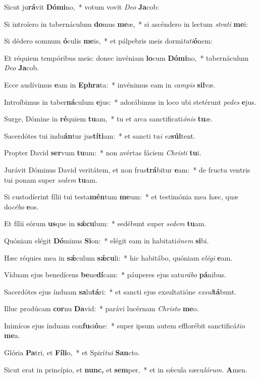 \item Sicut ju\textbf{rá}vit \textbf{Dó}\textbf{mi}no,~* votum vovit \textit{Deo} \textbf{Ja}cob:
\item Si introíero in tabernáculum \textbf{do}mus \textbf{me}æ,~* si ascéndero in lectum \textit{strati} \textbf{me}i:
\item Si dédero somnum \textbf{ó}culis \textbf{me}is,~* et pálpebris meis dormi\textit{tati}\textbf{ó}nem:
\item Et réquiem tempóribus meis: donec invéniam \textbf{lo}cum \textbf{Dó}\textbf{mi}no,~* tabernáculum \textit{Deo} \textbf{Ja}cob.
\item Ecce audívimus \textbf{e}am in \textbf{E}\textbf{phra}ta:~* invénimus eam in \textit{campis} \textbf{sil}væ.
\item Introíbimus in taber\textbf{ná}culum \textbf{e}jus:~* adorábimus in loco ubi stetérunt \textit{pedes} \textbf{e}jus.
\item Surge, Dómine in \textbf{ré}quiem \textbf{tu}am,~* tu et arca sanctificati\textit{ónis} \textbf{tu}æ.
\item Sacerdótes tui indu\textbf{án}tur jus\textbf{tí}\textbf{ti}am:~* et sancti tu\tinyhspace\textit{i} \textit{ex}\teenyhspace\textbf{súl}tent.
\item Propter David \textbf{ser}vum \textbf{tu}um:~* non avértas fáciem \textit{Christi} \textbf{tu}i.
\item Jurávit Dóminus David veritátem, et non frus\textbf{trá}bitur \textbf{e}am:~* de fructu ventris tui ponam super \textit{sedem} \textbf{tu}am.
\item Si custodíerint fílii tui testa\textbf{mén}tum \textbf{me}um:~* et testimónia mea hæc, quæ do\tinyhspace\textit{cébo} \textbf{e}os.
\item Et fílii eórum \textbf{us}que in \textbf{sǽ}\textbf{cu}lum:~* sedébunt super \textit{sedem} \textbf{tu}am.
\item Quóniam elégit \textbf{Dó}minus \textbf{Si}on:~* elégit eam in habitati\tinyhspace\textit{ónem} \textbf{si}bi.
\item Hæc réquies mea in \textbf{sǽ}culum \textbf{sǽ}\textbf{cu}li:~* hic habitábo, quóniam e\textit{légi} \textbf{e}am.
\item Víduam ejus benedícens \textbf{be}ne\textbf{dí}cam:~* páuperes ejus satu\tinyhspace\textit{rábo} \textbf{pá}nibus.
\item Sacerdótes ejus índuam \textbf{sa}lu\textbf{tá}ri:~* et sancti ejus exsultatióne \textit{exsul}\textbf{tá}bunt.
\item Illuc prodúcam \textbf{cor}nu \textbf{Da}vid:~* parávi lucérnam \textit{Christo} \textbf{me}o.
\item Inimícos ejus índuam con\textbf{fu}si\textbf{ó}ne:~* super ipsum autem efflorébit sanctificá\tinyhspace\textit{tio} \textbf{me}a.
\item Glória \textbf{Pa}tri, et \textbf{Fí}\textbf{li}o,~* et Spirí\tinyhspace\textit{tui} \textbf{San}cto.
\item Sicut erat in princípio, et \textbf{nunc,} et \textbf{sem}per,~* et in sǽcula sæcu\tinyhspace\textit{lórum.} \textbf{A}men.
